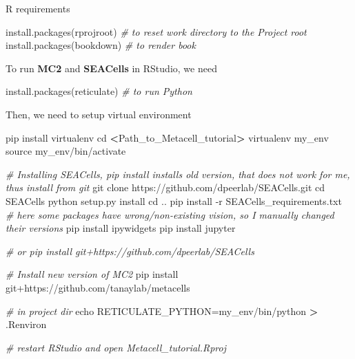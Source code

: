 \documentclass[
]{book}
\newenvironment{Shaded}{\begin{snugshade}}{\end{snugshade}}
\newcommand{\AttributeTok}[1]{\textcolor[rgb]{0.77,0.63,0.00}{#1}}
\newcommand{\BuiltInTok}[1]{#1}
\newcommand{\CommentTok}[1]{\textcolor[rgb]{0.56,0.35,0.01}{\textit{#1}}}
\newcommand{\ExtensionTok}[1]{#1}
\newcommand{\FunctionTok}[1]{\textcolor[rgb]{0.00,0.00,0.00}{#1}}
\newcommand{\NormalTok}[1]{#1}
\newcommand{\OperatorTok}[1]{\textcolor[rgb]{0.81,0.36,0.00}{\textbf{#1}}}
\newcommand{\StringTok}[1]{\textcolor[rgb]{0.31,0.60,0.02}{#1}}
\begin{document}
R requirements

\begin{Shaded}
\begin{Highlighting}[]
\FunctionTok{install.packages}\NormalTok{(}\StringTok{\textquotesingle{}rprojroot\textquotesingle{}}\NormalTok{) }\CommentTok{\# to reset work directory to the Project root}
\FunctionTok{install.packages}\NormalTok{(}\StringTok{\textquotesingle{}bookdown\textquotesingle{}}\NormalTok{) }\CommentTok{\# to render book}
\end{Highlighting}
\end{Shaded}

To run \textbf{MC2} and \textbf{SEACells} in RStudio, we need

\begin{Shaded}
\begin{Highlighting}[]
\FunctionTok{install.packages}\NormalTok{(}\StringTok{\textquotesingle{}reticulate\textquotesingle{}}\NormalTok{) }\CommentTok{\# to run Python}
\end{Highlighting}
\end{Shaded}

Then, we need to setup virtual environment

\begin{Shaded}
\begin{Highlighting}[]
\ExtensionTok{pip}\NormalTok{ install virtualenv}
\BuiltInTok{cd} \OperatorTok{\textless{}}\NormalTok{Path\_to\_Metacell\_tutorial}\OperatorTok{\textgreater{}}
\ExtensionTok{virtualenv}\NormalTok{ my\_env}
\BuiltInTok{source}\NormalTok{ my\_env/bin/activate}

\CommentTok{\# Installing SEACells, pip install installs old version, that does not work for me, thus install from git}
\FunctionTok{git}\NormalTok{ clone https://github.com/dpeerlab/SEACells.git}
\BuiltInTok{cd}\NormalTok{ SEACells}
\ExtensionTok{python}\NormalTok{ setup.py install}
\BuiltInTok{cd}\NormalTok{ ..}
\ExtensionTok{pip}\NormalTok{ install }\AttributeTok{{-}r}\NormalTok{ SEACells\_requirements.txt }\CommentTok{\# here some packages have wrong/non{-}existing vision, so I manually changed their versions }
\ExtensionTok{pip}\NormalTok{ install ipywidgets}
\ExtensionTok{pip}\NormalTok{ install jupyter}

\CommentTok{\# or pip install git+https://github.com/dpeerlab/SEACells }

\CommentTok{\# Install new version of MC2 }
\ExtensionTok{pip}\NormalTok{ install git+https://github.com/tanaylab/metacells}

\CommentTok{\# in project dir}
\BuiltInTok{echo} \StringTok{\textquotesingle{}RETICULATE\_PYTHON=my\_env/bin/python\textquotesingle{}} \OperatorTok{\textgreater{}} \StringTok{\textquotesingle{}.Renviron\textquotesingle{}} 

\CommentTok{\# restart RStudio and open \textquotesingle{}Metacell\_tutorial.Rproj\textquotesingle{} }
\end{Highlighting}
\end{Shaded}
\end{document}
